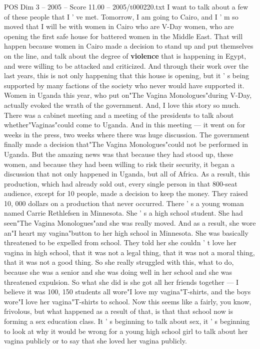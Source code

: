 \begin{textsample}{POS Dim 3 – 2005 – Score 11.00 – 2005/t000220.txt}
I want to talk about a few of these people that I ' ve met.
Tomorrow, I am going to Cairo, and I ' m so moved that I will be with women in Cairo who are V-Day women, who are opening the first safe house for battered women in the Middle East.
That will happen because women in Cairo made a decision to stand up and put themselves on the line, and talk about the degree of \textbf{violence} that is happening in Egypt, and were willing to be attacked and criticized.
And through their work over the last years, this is not only happening that this house is opening, but it ' s being supported by many factions of the society who never would have supported it.
Women in Uganda this year, who put on"The Vagina Monologues"during V-Day, actually evoked the wrath of the government.
And, I love this story so much.
There was a cabinet meeting and a meeting of the presidents to talk about whether"Vaginas"could come to Uganda.
And in this meeting — it went on for weeks in the press, two weeks where there was huge discussion.
The government finally made a decision that"The Vagina Monologues"could not be performed in Uganda.
But the amazing news was that because they had stood up, these women, and because they had been willing to risk their security, it began a discussion that not only happened in Uganda, but all of Africa.
As a result, this production, which had already sold out, every single person in that 800-seat audience, except for 10 people, made a decision to keep the money.
They raised 10, 000 dollars on a production that never occurred.
There ' s a young woman named Carrie Rethlefsen in Minnesota.
She ' s a high school student.
She had seen"The Vagina Monologues"and she was really moved.
And as a result, she wore an"I heart my vagina"button to her high school in Minnesota.
She was basically threatened to be expelled from school.
They told her she couldn ' t love her vagina in high school, that it was not a legal thing, that it was not a moral thing, that it was not a good thing.
So she really struggled with this, what to do, because she was a senior and she was doing well in her school and she was threatened expulsion.
So what she did is she got all her friends together — I believe it was 100, 150 students all wore"I love my vagina"T-shirts, and the boys wore"I love her vagina"T-shirts to school.
Now this seems like a fairly, you know, frivolous, but what happened as a result of that, is that that school now is forming a sex education class.
It ' s beginning to talk about sex, it ' s beginning to look at why it would be wrong for a young high school girl to talk about her vagina publicly or to say that she loved her vagina publicly.

\end{textsample}
